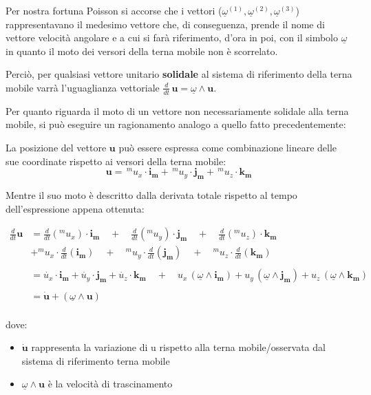 		Per nostra fortuna Poisson si accorse che i vettori ($\underline{\omega}^{(1)}, \underline{\omega}^{(2)}, \underline{\omega}^{(3)}$) rappresentavano il medesimo vettore che, di conseguenza, prende il nome di vettore velocità angolare e a cui si farà riferimento, d'ora in poi, con il simbolo $\underline{\omega}$ in quanto il moto dei versori della terna mobile non è scorrelato.
		
		Perciò, per qualsiasi vettore unitario \textbf{solidale} al sistema di riferimento della terna mobile varrà l'uguaglianza vettoriale $ \frac{d}{dt} \,{\mathbf{u}} = \underline{\omega} \wedge \mathbf{u}$.
		
		Per quanto riguarda il moto di un vettore non necessariamente solidale alla terna mobile, si può eseguire un ragionamento analogo a quello fatto precedentemente:
		
		La posizione del vettore $\mathbf{u}$ può essere espressa come combinazione lineare delle sue coordinate rispetto ai versori della terna mobile:
			\[\mathbf{u} =  \, ^mu_x \cdot \mathbf{i_m} +\, ^mu_y \cdot \mathbf{j_m} +\, ^mu_z \cdot \mathbf{k_m}\]

		Mentre il suo moto è descritto dalla derivata totale rispetto al tempo dell'espressione appena ottenuta:
		
		\begin{equation*}
		\begin{split}
			\frac{d}{dt}\mathbf{u} &= \frac{d}{dt}(^mu_x) \cdot \mathbf{i_m} \quad + \quad \frac{d}{dt}(^mu_y) \cdot \mathbf{j_m} \quad + \quad \frac{d}{dt}(^mu_z) \cdot \mathbf{k_m}\\
							& + ^mu_x \cdot \frac{d}{dt}(\mathbf{i_m}) \quad + \quad ^mu_y \cdot \frac{d}{dt}(\mathbf{j_m}) \quad +\quad  ^mu_z \cdot \frac{d}{dt}(\mathbf{k_m})\\
\\
						&=  \dot{u_x} \cdot \mathbf{i_m} + \dot{u_y}\cdot \mathbf{j_m} + \dot{u_z} \cdot \mathbf{k_m} \quad + \quad u_x\,(\underline{\omega}\wedge{\mathbf{i_m}}) +u_y\,(\underline{\omega} \wedge{\mathbf{j_m}}) + u_z\,(\underline{\omega} \wedge{\mathbf{k_m}})\\
\\
						&= \dot{\mathbf{u}} + (\underline{\omega} \wedge {\mathbf{u}})\\
		\end{split}
		\end{equation*}
		

		dove:
			\begin{itemize}
			\item $\dot{\mathbf{u}}$ \hspace{2mm} rappresenta la variazione di u rispetto alla terna mobile/osservata dal sistema di riferimento terna mobile
				\item $\underline{\omega} \wedge {\mathbf{u}}$ \hspace{2mm} è la velocità di trascinamento
			\end{itemize}
		
